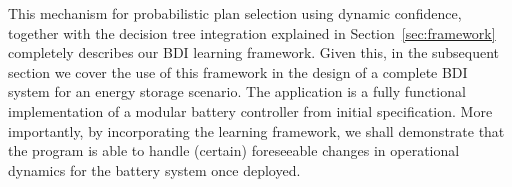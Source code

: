 This mechanism for probabilistic plan selection using dynamic confidence, together with the decision tree integration explained in Section~\ref{sec:framework} completely describes our BDI learning framework. Given this, in the subsequent section we cover the use of this framework in the design of a complete BDI system for an energy storage scenario. The application is a fully functional implementation of a modular battery controller from initial specification. More importantly, by incorporating the learning framework, we shall demonstrate that the program is able to handle (certain) foreseeable changes in operational dynamics for the battery system once deployed.

